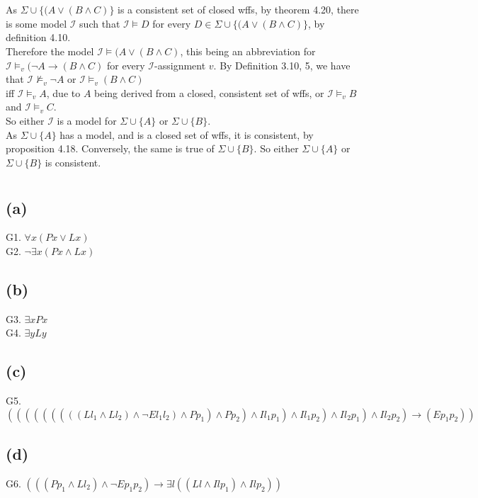 \documentclass[11pt,oneside,a4paper]{article}
\begin{document}
\section{}
As $\Sigma \cup \{ (A \vee (B \wedge C) \}$ is a consistent set of closed wffs, by theorem 4.20, there is some model $\mathcal{I}$ such that $\mathcal{I} \vDash D$ for every $D \in \Sigma \cup \{ (A \vee (B \wedge C) \}$, by definition 4.10.\\
Therefore the model $\mathcal{I} \vDash (A \vee (B \wedge C)$, this being an abbreviation for $\mathcal{I} \vDash_v (\neg A \to (B \wedge C)$ for every $\mathcal{I}$-assignment $v$. By Definition 3.10, 5, we have that $\mathcal{I} \nvDash_v \neg A$ or $\mathcal{I} \vDash_v (B \wedge C)$\\
iff $\mathcal{I} \vDash_v A$, due to $A$ being derived from a closed, consistent set of wffs, or $\mathcal{I} \vDash_v B$ and $\mathcal{I} \vDash_v C$.\\
So either $\mathcal{I}$ is a model for $\Sigma \cup \{ A \}$ or $\Sigma \cup \{ B \}$.\\
As $\Sigma \cup \{ A \}$ has a model, and is a closed set of wffs, it is consistent, by proposition 4.18. Conversely, the same is true of $\Sigma \cup \{ B \}$. So either $\Sigma \cup \{ A \}$ or $\Sigma \cup \{ B \}$ is consistent.

\section{}
\subsection*{(a)}
G1. $\forall x (Px \vee Lx)$\\
G2. $\neg \exists x (Px \wedge Lx)$
\subsection*{(b)}
G3. $\exists x Px$\\
G4. $\exists y Ly$
\subsection*{(c)}
G5. $(((((((((Ll_1 \wedge Ll_2) \wedge \neg E l_1 l_2) \wedge Pp_1) \wedge Pp_2) \wedge Il_1p_1) \wedge Il_1p_2) \wedge Il_2p_1) \wedge Il_2p_2) \to (Ep_1p_2))$
\subsection*{(d)}
G6. $(((Pp_1 \wedge Ll_2) \wedge \neg Ep_1p_2)\to \exists l((Ll \wedge Ilp_1) \wedge Ilp_2))$
\end{document}

